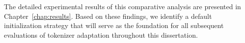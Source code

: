 The detailed experimental results of this comparative analysis are presented in Chapter~\ref{chap:results}. Based on these findings, we identify a default initialization strategy that will serve as the foundation for all subsequent evaluations of tokenizer adaptation throughout this dissertation.








